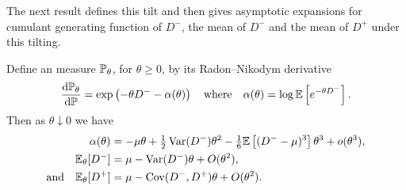 The next result defines this tilt and then gives asymptotic expansions for cumulant generating function of $D^-$, the mean of $D^-$ and the mean of $D^+$ under this tilting. 
\begin{lemma}
    \label{lem:asym-expansions}
    Define an measure $\P_{\theta}$, for $\theta \geq 0$, by its Radon--Nikodym derivative
    \begin{equation*}
        \diff{\P_{\theta}}{\P} = \exp\left( - \theta D^- - \alpha(\theta) \right)
        \quad \text{where} \quad
        \alpha(\theta) = \log \E \left[ e^{-\theta D^-} \right].
    \end{equation*}
    Then as $\theta \downarrow 0$ we have
    \begin{align*}
        \alpha(\theta) &= -\mu \theta + \tfrac{1}{2}\var(D^-) \theta^2 - \tfrac{1}{6} \E \left[ (D^- - \mu)^3 \right] \theta^3 + \littleo(\theta^3), \\
        \E_{\theta}[D^-] &= \mu - \var(D^-) \theta + \bigo(\theta^2), \\
        \text{and} \quad \E_{\theta}[D^+] &= \mu - \cov(D^-, D^+) \theta + \bigo(\theta^2).
    \end{align*}
\end{lemma}
